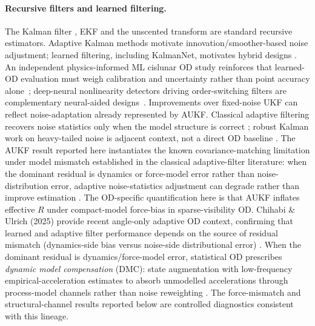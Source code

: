 \documentclass{article}
\begin{document}
\paragraph{Recursive filters and learned filtering.}
The Kalman filter \cite{kalman1960}, EKF \cite{jazwinski1970stochastic} and the unscented transform \cite{julier1997unscented,wan2000unscented} are standard recursive estimators. Adaptive Kalman methods motivate innovation/smoother-based noise adjustment; learned filtering, including KalmanNet, motivates hybrid designs \cite{mehra1970adaptive,kruse2025adaptive,haarnoja2016,revach2022kalmannet,mortada2025recursivekalmannet}. An independent physics-informed ML cislunar OD study reinforces that learned-OD evaluation must weigh calibration and uncertainty rather than point accuracy alone~\cite{badura2025piml}; deep-neural nonlinearity detectors driving order-switching filters are complementary neural-aided designs~\cite{zhou2023orderswitching}. Improvements over fixed-noise UKF can reflect noise-adaptation already represented by AUKF. Classical adaptive filtering recovers noise statistics only when the model structure is correct \cite{mehra1970adaptive,sage1969adaptive,jazwinski1970stochastic}; robust Kalman work on heavy-tailed noise is adjacent context, not a direct OD baseline \cite{wang2026heavytailedkf}. The AUKF result reported here instantiates the known covariance-matching limitation under model mismatch established in the classical adaptive-filter literature: when the dominant residual is dynamics or force-model error rather than noise-distribution error, adaptive noise-statistics adjustment can degrade rather than improve estimation \cite{mehra1970adaptive,sage1969adaptive,jazwinski1970stochastic}. The OD-specific quantification here is that AUKF inflates effective $R$ under compact-model force-bias in sparse-visibility OD. Chihabi \& Ulrich (2025) provide recent angle-only adaptive OD context, confirming that learned and adaptive filter performance depends on the source of residual mismatch (dynamics-side bias versus noise-side distributional error) \cite{chihabi2025adaptive}. When the dominant residual is dynamics/force-model error, statistical OD prescribes \emph{dynamic model compensation} (DMC): state augmentation with low-frequency empirical-acceleration estimates to absorb unmodelled accelerations through process-model channels rather than noise reweighting \cite{tapley2004statistical,wright1981drag,stacey2021adaptive,wang2026empiricalacceleration}. The force-mismatch and structural-channel results reported below are controlled diagnostics consistent with this lineage.
\end{document}
